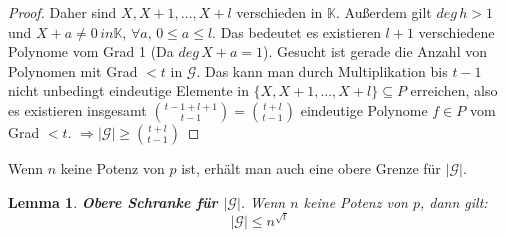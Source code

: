 \documentclass[12pt,oneside]{article}
\newtheorem{lemma}[theorem]{Lemma}
\theoremstyle{remark}
\theoremstyle{definition}
\begin{document}
\begin{proof}
Daher sind $X, X + 1, ..., X + l$ verschieden in $\mathbb{K}$. Außerdem gilt $deg \, h > 1$ und $X + a \neq 0 \, in \mathbb{K}, \, \forall a, \, 0 \leq a \leq l $. Das bedeutet es existieren $l + 1$ verschiedene Polynome vom Grad 1 (Da $deg \, X + a = 1$). Gesucht ist gerade die Anzahl von Polynomen mit Grad $ < t $ in $\mathcal{G}$. Das kann man durch Multiplikation bis $t - 1$ nicht unbedingt eindeutige Elemente in $\{ X, X + 1, ..., X+ l\} \subseteq P$ erreichen, also es existieren insgesamt ${t - 1 + l +1 \choose t - 1} = {t + l \choose t - 1}$ eindeutige Polynome $f \in P$ vom Grad $ < t$.\newline\newline
$\Rightarrow |\mathcal{G}| \geq {t + l \choose t - 1}$
\end{proof}

Wenn $n$ keine Potenz von $p$ ist, erhält man auch eine obere Grenze für $|\mathcal{G}|$.

\begin{lemma}\label{closing_lemma}
\textbf{Obere Schranke für $|\mathcal{G}|$}.\newline
Wenn $n$ keine Potenz von $p$, dann gilt:
\begin{equation}
    |\mathcal{G}| \leq  n^{\sqrt{t}}
\end{equation}
\end{lemma}
\end{document}
